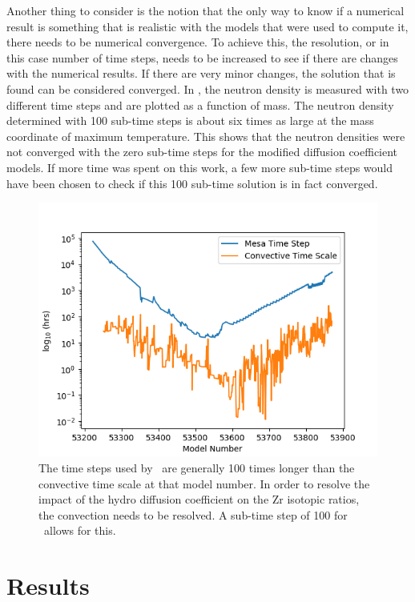 \documentclass[fleqn,usenatbib]{mnras}
\begin{document}
Another thing to consider is the notion that the only way to know if a numerical result is something that is realistic with the models that were used to compute it, there needs to be numerical convergence. To achieve this, the resolution, or in this case number of time steps, needs to be increased to see if there are changes with the numerical results. If there are very minor changes, the solution that is found can be considered converged. In , the neutron density is measured with two different time steps and are plotted as a function of mass. The neutron density determined with 100 sub-time steps is about six times as large at the mass coordinate of maximum temperature. This shows that the neutron densities were not converged with the zero sub-time steps for the modified diffusion coefficient models. If more time was spent on this work, a few more sub-time steps would have been chosen to check if this 100 sub-time solution is in fact converged.

\begin{figure}
  \includegraphics[width=\columnwidth]{figs/Time_scale.png}
  \caption{The time steps used by \MESA~are generally 100 times longer than the convective time scale at that model number. In order to resolve the impact of the hydro diffusion coefficient on the Zr isotopic ratios, the convection needs to be resolved. A sub-time step of 100 for \mppnp~allows for this.} 
\end{figure}

\section{Results}
\end{document}

